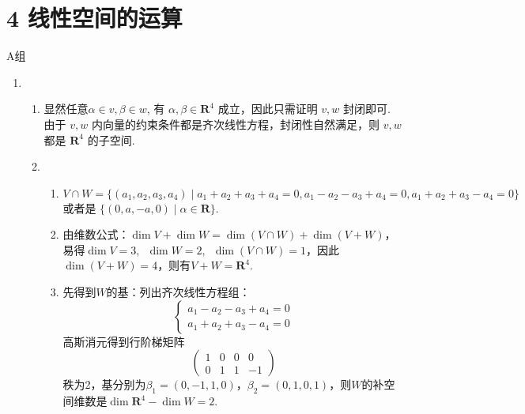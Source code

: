 \section*{4 线性空间的运算}

\vspace{2ex}

\centerline{\heiti A组}
\begin{enumerate}
    \item \begin{enumerate}
              \item 显然任意$\alpha\in v,\beta \in w$, 有 $\alpha,\beta\in \mathbf{R}^4$ 成立，因此只需证明 $v,w$ 封闭即可. 由于 $v,w$ 内向量的约束条件都是齐次线性方程，封闭性自然满足，则 $v,w$ 都是 $\mathbf{R}^4$ 的子空间.

              \item \begin{enumerate}
                        \item $V\cap W=\{(a_1,a_2,a_3,a_4) \mid a_1+a_2+a_3+a_4=0,a_1-a_2-a_3+a_4=0,a_1+a_2+a_3-a_4=0\}$ 或者是 $\{(0,a,-a,0) \mid \alpha\in \mathbf{R}\}$.

                        \item 由维数公式：$\dim V+\dim W=\dim (V\cap W)+\dim (V+W)$，易得$\dim V=3,\enspace \dim W=2,\enspace \dim (V\cap W)=1$，因此$\dim (V+W)=4$，则有$V+W=\mathbf{R}^4$.

                        \item 先得到$W$的基：列出齐次线性方程组：
                              \[\begin{cases}
                                      a_1-a_2-a_3+a_4=0 \\
                                      a_1+a_2+a_3-a_4=0\end{cases}
                              \]
                              高斯消元得到行阶梯矩阵
                              \[\begin{pmatrix}
                                      1 & 0 & 0 & 0  \\
                                      0 & 1 & 1 & -1
                                  \end{pmatrix}\]
                              秩为2，基分别为$\beta_1= (0,-1,1,0)$，$\beta_2= (0,1,0,1)$，则$W$的补空间维数是$\dim \mathbf{R}^4 - \dim W=2$.


\end{enumerate}
\end{enumerate}
\end{enumerate}
